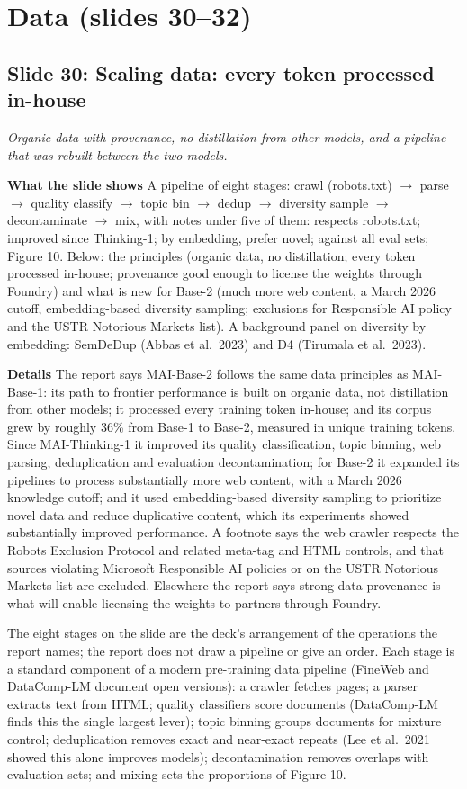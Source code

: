 \documentclass[11pt,letterpaper]{article}
\newcommand{\slide}[3]{%
  \subsection[Slide #1: #2]{Slide #1: #2}%
  {\color{muted}\itshape #3\par}\medskip}
\newcommand{\para}[1]{\medskip\noindent\textbf{#1}\quad}
\begin{document}
\section{Data (slides 30--32)}

\slide{30}{Scaling data: every token processed in-house}{Organic data with provenance, no distillation from other models, and a pipeline that was rebuilt between the two models.}

\para{What the slide shows} A pipeline of eight stages: crawl (robots.txt) $\to$ parse $\to$ quality classify $\to$ topic bin $\to$ dedup $\to$ diversity sample $\to$ decontaminate $\to$ mix, with notes under five of them: respects robots.txt; improved since Thinking-1; by embedding, prefer novel; against all eval sets; Figure 10. Below: the principles (organic data, no distillation; every token processed in-house; provenance good enough to license the weights through Foundry) and what is new for Base-2 (much more web content, a March 2026 cutoff, embedding-based diversity sampling; exclusions for Responsible AI policy and the USTR Notorious Markets list). A background panel on diversity by embedding: SemDeDup (Abbas et al.\ 2023) and D4 (Tirumala et al.\ 2023).

\para{Details} The report says MAI-Base-2 follows the same data principles as MAI-Base-1: its path to frontier performance is built on organic data, not distillation from other models; it processed every training token in-house; and its corpus grew by roughly 36\% from Base-1 to Base-2, measured in unique training tokens. Since MAI-Thinking-1 it improved its quality classification, topic binning, web parsing, deduplication and evaluation decontamination; for Base-2 it expanded its pipelines to process substantially more web content, with a March 2026 knowledge cutoff; and it used embedding-based diversity sampling to prioritize novel data and reduce duplicative content, which its experiments showed substantially improved performance. A footnote says the web crawler respects the Robots Exclusion Protocol and related meta-tag and HTML controls, and that sources violating Microsoft Responsible AI policies or on the USTR Notorious Markets list are excluded. Elsewhere the report says strong data provenance is what will enable licensing the weights to partners through Foundry.

The eight stages on the slide are the deck's arrangement of the operations the report names; the report does not draw a pipeline or give an order. Each stage is a standard component of a modern pre-training data pipeline (FineWeb and DataComp-LM document open versions): a crawler fetches pages; a parser extracts text from HTML; quality classifiers score documents (DataComp-LM finds this the single largest lever); topic binning groups documents for mixture control; deduplication removes exact and near-exact repeats (Lee et al.\ 2021 showed this alone improves models); decontamination removes overlaps with evaluation sets; and mixing sets the proportions of Figure 10.
\end{document}
